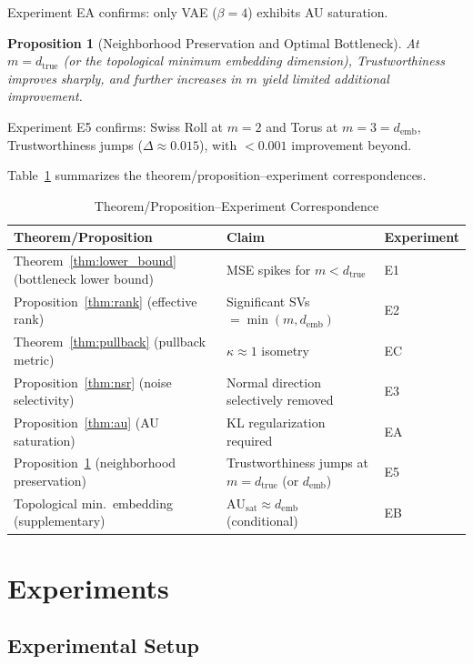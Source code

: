 \documentclass[12pt,a4paper]{article}
\newtheorem{proposition}{Proposition}
\newcommand{\dtrue}{d_{\mathrm{true}}}
\newcommand{\kap}{\kappa}
\newcommand{\AUsat}{\mathrm{AU}_{\mathrm{sat}}}
\newcommand{\demb}{d_{\mathrm{emb}}}
\begin{document}
Experiment EA confirms: only VAE ($\beta=4$) exhibits AU saturation.

\begin{proposition}[Neighborhood Preservation and Optimal Bottleneck]\label{thm:trust}
At $m = \dtrue$ (or the topological minimum embedding dimension), Trustworthiness improves sharply, and further increases in $m$ yield limited additional improvement.
\end{proposition}

Experiment E5 confirms: Swiss Roll at $m=2$ and Torus at $m=3=\demb$, Trustworthiness jumps ($\Delta \approx 0.015$), with $< 0.001$ improvement beyond.

Table~\ref{tab:theorem_exp} summarizes the theorem/proposition--experiment correspondences.

\begin{table}[H]
\centering
\caption{Theorem/Proposition--Experiment Correspondence}
\label{tab:theorem_exp}
\begin{tabular}{lll}
\toprule
Theorem/Proposition & Claim & Experiment \\
\midrule
Theorem~\ref{thm:lower_bound} (bottleneck lower bound) & MSE spikes for $m < \dtrue$ & E1 \\
Proposition~\ref{thm:rank} (effective rank) & Significant SVs $= \min(m,\demb)$ & E2 \\
Theorem~\ref{thm:pullback} (pullback metric) & $\kap \approx 1$ isometry & EC \\
Proposition~\ref{thm:nsr} (noise selectivity) & Normal direction selectively removed & E3 \\
Proposition~\ref{thm:au} (AU saturation) & KL regularization required & EA \\
Proposition~\ref{thm:trust} (neighborhood preservation) & Trustworthiness jumps at $m = \dtrue$ (or $\demb$) & E5 \\
Topological min.\ embedding (supplementary) & $\AUsat \approx \demb$ (conditional) & EB \\
\bottomrule
\end{tabular}
\end{table}

\section{Experiments}\label{sec:exp}

\subsection{Experimental Setup}\label{sec:exp_setup}
\end{document}

